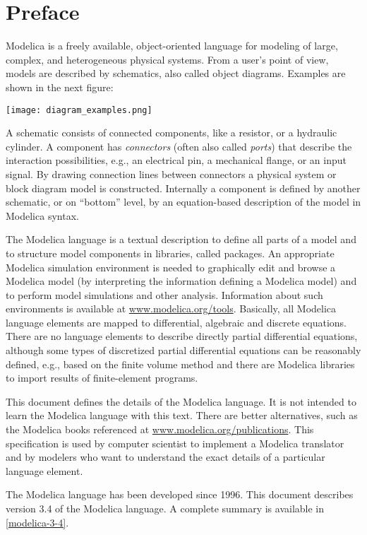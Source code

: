\chapter*{Preface}\label{preface}
Modelica is a freely available, object-oriented language for modeling of
large, complex, and heterogeneous physical systems. From a user's point
of view, models are described by schematics, also called object
diagrams. Examples are shown in the next figure:

\texttt{[image: diagram\_examples.png]}

A schematic consists of connected components, like a resistor, or a
hydraulic cylinder. A component has \emph{connectors} (often also called
\emph{ports}) that describe the interaction possibilities, e.g., an
electrical pin, a mechanical flange, or an input signal. By drawing
connection lines between connectors a physical system or block diagram
model is constructed. Internally a component is defined by another
schematic, or on ``bottom'' level, by an equation-based description of
the model in Modelica syntax.

The Modelica language is a textual description to define all parts of a
model and to structure model components in libraries, called packages.
An appropriate Modelica simulation environment is needed to graphically
edit and browse a Modelica model (by interpreting the information
defining a Modelica model) and to perform model simulations and other
analysis. Information about such environments is available at
\href{https://www.modelica.org/tools}{www.modelica.org/tools}. Basically,
all Modelica language elements are mapped to differential, algebraic and
discrete equations. There are no language elements to describe directly
partial differential equations, although some types of discretized
partial differential equations can be reasonably defined, e.g., based on
the finite volume method and there are Modelica libraries to import
results of finite-element programs.

This document defines the details of the Modelica language. It is not
intended to learn the Modelica language with this text. There are better
alternatives, such as the Modelica books referenced at
\href{https://www.modelica.org/publications}{www.modelica.org/publications}.
This specification is used by computer scientist to implement a Modelica
translator and by modelers who want to understand the exact details of a
particular language element.

The Modelica language has been developed since 1996. This document
describes version 3.4 of the Modelica language. A complete summary is
available in \cref{modelica-3-4}.
